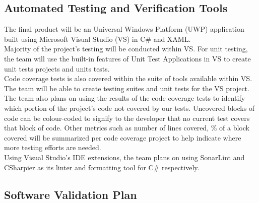 \documentclass[12pt, titlepage]{article}
\begin{document}
\subsection{Automated Testing and Verification Tools}

The final product will be an Universal Windows Platform (UWP) application built using Microsoft Visual Studio (VS) in C\# and XAML. \\

\noindent Majority of the project's testing will be conducted within VS. 
For unit testing, the team will use the built-in features of Unit Test Applications in VS to create unit tests projects and units tests.\\

\noindent Code coverage tests is also covered within the suite of tools available within VS. The team will be able to create testing suites and 
unit tests for the VS project. The team also plans on using the results of the code coverage
tests to identify which portion of the project's code not covered by our tests. Uncovered blocks of code can be colour-coded to signify to 
the developer that no current test covers that block of code. Other metrics such as number of lines covered, \% of a block covered will be 
summarized per code coverage project to help indicate where more testing efforts are needed. \\

\noindent Using Visual Studio's IDE extensions, the team plans on using SonarLint and CSharpier as its linter and formatting tool for C\# respectively. 



\subsection{Software Validation Plan}
\end{document}
